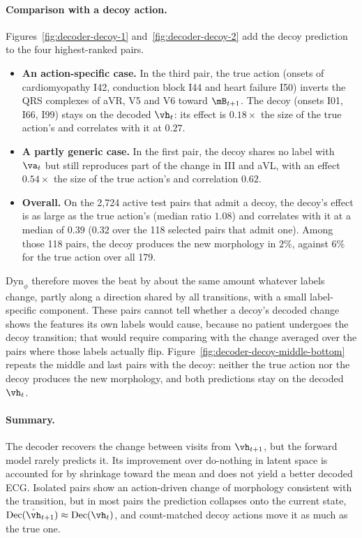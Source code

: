 \paragraph{Comparison with a decoy action.} Figures~\ref{fig:decoder-decoy-1} and~\ref{fig:decoder-decoy-2} add the decoy prediction to the four highest-ranked pairs.
\begin{itemize}
\item \textbf{An action-specific case.} In the third pair, the true action (onsets of cardiomyopathy I42, conduction block I44 and heart failure I50) inverts the QRS complexes of aVR, V5 and V6 toward $\mB_{t+1}$. The decoy (onsets I01, I66, I99) stays on the decoded $\vh_t$: its effect is $0.18\times$ the size of the true action's and correlates with it at $0.27$.
\item \textbf{A partly generic case.} In the first pair, the decoy shares no label with $\va_t$ but still reproduces part of the change in III and aVL, with an effect $0.54\times$ the size of the true action's and correlation $0.62$.
\item \textbf{Overall.} On the 2{,}724 active test pairs that admit a decoy, the decoy's effect is as large as the true action's (median ratio $1.08$) and correlates with it at a median of $0.39$ ($0.32$ over the 118 selected pairs that admit one). Among those 118 pairs, the decoy produces the new morphology in $2\%$, against $6\%$ for the true action over all 179.
\end{itemize}
$\text{Dyn}_\phi$ therefore moves the beat by about the same amount whatever labels change, partly along a direction shared by all transitions, with a small label-specific component. These pairs cannot tell whether a decoy's decoded change shows the features its own labels would cause, because no patient undergoes the decoy transition; that would require comparing with the change averaged over the pairs where those labels actually flip. Figure~\ref{fig:decoder-decoy-middle-bottom} repeats the middle and last pairs with the decoy: neither the true action nor the decoy produces the new morphology, and both predictions stay on the decoded $\vh_t$.

\paragraph{Summary.} The decoder recovers the change between visits from $\vh_{t+1}$, but the forward model rarely predicts it. Its improvement over do-nothing in latent space is accounted for by shrinkage toward the mean and does not yield a better decoded ECG. Isolated pairs show an action-driven change of morphology consistent with the transition, but in most pairs the prediction collapses onto the current state, $\text{Dec}(\hat{\vh}_{t+1})\approx\text{Dec}(\vh_t)$, and count-matched decoy actions move it as much as the true one.

